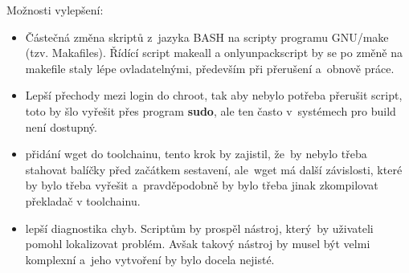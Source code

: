 \documentclass[a4paper,12pt]{article}
\renewcommand{\b}[1]{\textbf{#1}} %
\begin{document}
Možnosti vylepšení:
\begin{itemize}
 \item Částečná změna skriptů z~jazyka BASH na scripty programu GNU/make (tzv. Makafiles). Řídící script makeall a onlyunpackscript by se po změně na makefile staly lépe ovladatelnými, především při přerušení a~obnově práce.
 \item Lepší přechody mezi login do chroot, tak aby nebylo potřeba přerušit script, toto by šlo vyřešit přes program \b{sudo}, ale ten často v~systémech pro build není dostupný.
 \item přidání wget do toolchainu, tento krok by zajistil, že~by nebylo třeba stahovat balíčky před začátkem sestavení, ale~wget má další závislosti, které by bylo třeba vyřešit a~pravděpodobně by bylo třeba jinak zkompilovat překladač v toolchainu.
 \item lepší diagnostika chyb. Scriptům by prospěl nástroj, který~by uživateli pomohl lokalizovat problém. Avšak takový nástroj by musel být velmi komplexní a~jeho vytvoření by bylo docela nejisté.
\end{itemize}
\end{document}
